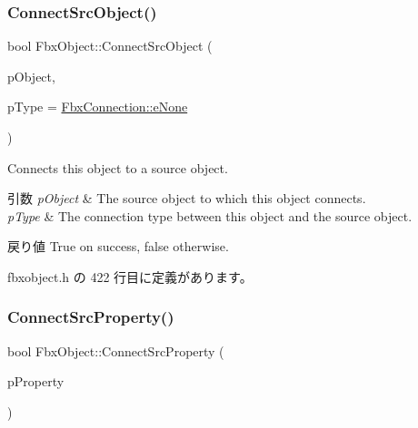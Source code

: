 \subsubsection{\texorpdfstring{Connect\+Src\+Object()}{ConnectSrcObject()}}
{\footnotesize\ttfamily bool Fbx\+Object\+::\+Connect\+Src\+Object (\begin{DoxyParamCaption}\item[{\hyperlink{class_fbx_object}{Fbx\+Object} $\ast$}]{p\+Object,  }\item[{\hyperlink{class_fbx_connection_a3df448a5db356652ab99fd2be2553749}{Fbx\+Connection\+::\+E\+Type}}]{p\+Type = {\ttfamily \hyperlink{class_fbx_connection_a3df448a5db356652ab99fd2be2553749a47aa04870c3c0769263e3972e67e9ebe}{Fbx\+Connection\+::e\+None}} }\end{DoxyParamCaption})\hspace{0.3cm}{\ttfamily [inline]}}

Connects this object to a source object. 
\begin{DoxyParams}{引数}
{\em p\+Object} & The source object to which this object connects. \\
\hline
{\em p\+Type} & The connection type between this object and the source object. \\
\hline
\end{DoxyParams}
\begin{DoxyReturn}{戻り値}
{\ttfamily True} on success, {\ttfamily false} otherwise. 
\end{DoxyReturn}


 fbxobject.\+h の 422 行目に定義があります。

\mbox{\label{class_fbx_object_aef0b1c0672a044b6e44c824b9469c7e7}} 
\subsubsection{\texorpdfstring{Connect\+Src\+Property()}{ConnectSrcProperty()}}
{\footnotesize\ttfamily bool Fbx\+Object\+::\+Connect\+Src\+Property (\begin{DoxyParamCaption}\item[{const \hyperlink{class_fbx_property}{Fbx\+Property} \&}]{p\+Property }\end{DoxyParamCaption})\hspace{0.3cm}{\ttfamily [inline]}}

